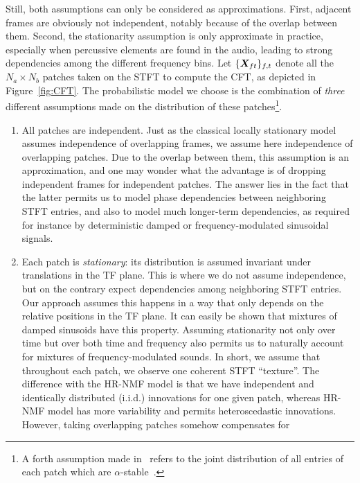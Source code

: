 Still, both assumptions can only be considered as approximations.
First, adjacent frames are obviously not independent, notably because
of the overlap between them. Second, the stationarity assumption is
only approximate in practice, especially when percussive elements are
found in the audio, leading to strong dependencies among the different
frequency bins. Let $\{ {\bm{X}}_{ft}\} _{f,t}$
denote all the $N_{a}\times N_{b}$ patches taken on the STFT to compute
the CFT, as depicted in Figure~\ref{fig:CFT}. The probabilistic
model we choose is the combination of \emph{three} different assumptions
made on the distribution of these patches\footnote{A forth assumption made in~\cite{stoeter16} refers to the joint distribution of all entries of each patch which are $\alpha$-stable~\cite{samoradnitsky94}.}.

\begin{enumerate}[leftmargin=0cm,itemindent=.5cm,labelwidth=\itemindent,labelsep=0cm,align=left]
\item All patches are independent. 
Just as the classical locally stationary
model~\cite{liutkus11t} assumes independence of overlapping frames,
we assume here independence of overlapping patches. Due to the
overlap between them, this assumption is an approximation,
and one may wonder what the advantage is of dropping independent frames
for independent patches. 
The answer lies in the fact that the latter permits us to model phase dependencies between neighboring STFT entries, and also to model much longer-term dependencies, as required for instance by deterministic damped or frequency-modulated sinusoidal signals.\label{enu:assumption_independent_patches}
\item Each patch is \emph{stationary}: its distribution
is assumed invariant under translations in the TF plane. This is where we do not assume independence, but on the contrary expect dependencies among neighboring STFT entries. Our approach assumes this happens in a way that only depends on the relative positions in
the TF plane. It can easily be shown that mixtures of
damped sinusoids have this property. Assuming stationarity not only over time but over both time and frequency
also permits us to naturally account for mixtures of frequency-modulated
sounds. In short, we assume that throughout each patch, we observe
one coherent STFT ``texture''. The difference with the HR-NMF model is that we have independent and identically
distributed (i.i.d.) innovations for one given patch, whereas HR-NMF model has more variability and permits heteroscedastic innovations. However, taking overlapping patches somehow compensates for

\end{enumerate}
